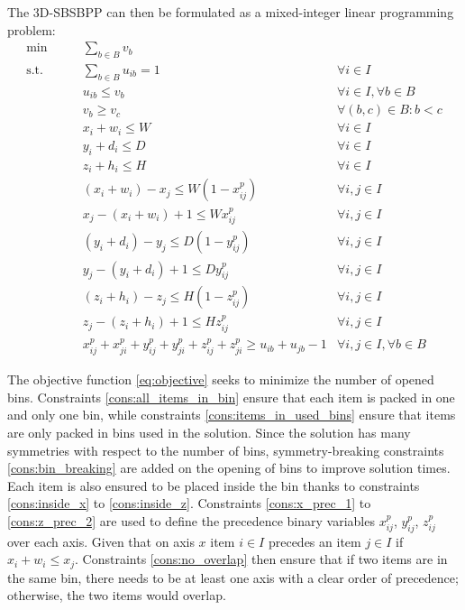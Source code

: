 The 3D-SBSBPP can then be formulated as a mixed-integer linear programming problem:
\label{par:standard_const}
\begin{align}
   \min       \qquad& \sum\limits_{b \in B} v_b & \label{eq:objective} \\
   \text{s.t.} \qquad& \sum\limits_{b \in B}{u_{ib}} = 1 & \forall i \in I  \label{cons:all_items_in_bin} \\
                    & u_{ib} \le v_b & \forall i \in I, \forall b \in B \label{cons:items_in_used_bins} \\
                    & v_b \ge v_c & \forall (b,c) \in B : b < c  \label{cons:bin_breaking} \\
                    & x_i + w_i \le W & \forall i \in I \label{cons:inside_x} \\ 
                    & y_i + d_i \le D & \forall i \in I \label{cons:inside_y} \\ 
                    & z_i + h_i \le H & \forall i \in I \label{cons:inside_z} \\ 
                    & (x_i + w_i) - x_j\le W(1 - x^p_{ij}) & \forall i,j \in I \label{cons:x_prec_1} \\
                    & x_j - (x_i + w_i) + 1 \le W x^p_{ij} & \forall i,j \in I \label{cons:x_prec_2} \\
                    & (y_i + d_i) - y_j \le D(1 - y^p_{ij}) & \forall i,j \in I \label{cons:y_prec_1} \\
                    & y_j - (y_i + d_i) + 1 \le D y^p_{ij} & \forall i,j \in I \label{cons:y_prec_2} \\
                    & (z_i + h_i) - z_j\le H(1 - z^p_{ij}) & \forall i,j \in I \label{cons:z_prec_1} \\
                    & z_j - (z_i + h_i) + 1 \le H z^p_{ij} & \forall i,j \in I \label{cons:z_prec_2} \\
                    & x^p_{ij} + x^p_{ji} + y^p_{ij} + y^p_{ji} + z^p_{ij} + z^p_{ji} \ge u_{ib} + u_{jb} - 1 & \forall i,j \in I, \forall b \in B \label{cons:no_overlap}
\end{align}

The objective function \ref{eq:objective} seeks to minimize the number of opened bins.
Constraints \ref{cons:all_items_in_bin} ensure that each item is packed in one and only one bin, while constraints \ref{cons:items_in_used_bins} ensure that items are only packed in bins used in the solution.
Since the solution has many symmetries with respect to the number of bins, symmetry-breaking constraints \ref{cons:bin_breaking} are added on the opening of bins to improve solution times.
Each item is also ensured to be placed inside the bin thanks to constraints \ref{cons:inside_x} to \ref{cons:inside_z}.
Constraints \ref{cons:x_prec_1} to \ref{cons:z_prec_2} are used to define the precedence binary variables $x^p_{ij}$, $y^p_{ij}$, $z^p_{ij}$ over each axis. Given that on axis $x$ item $i \in I$ precedes an item $j \in I$ if $x_i + w_i \le x_j$.
Constraints \ref{cons:no_overlap} then ensure that if two items are in the same bin, there needs to be at least one axis with a clear order of precedence; otherwise, the two items would overlap.

